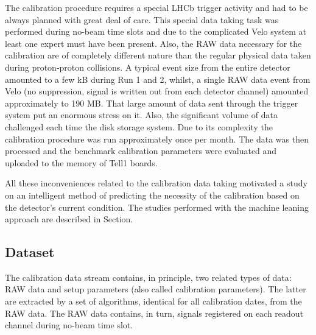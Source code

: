 The calibration procedure requires a special LHCb trigger activity and had to be always planned with great deal of care. This special data taking task was performed during no-beam time slots and due to the complicated Velo system at least one expert must have been present. Also, the RAW data necessary for the calibration are of completely different nature than the regular physical data taken during proton-proton collisions. A typical event size from the entire detector amounted to a few kB during Run 1 and 2, whilst, a single RAW data event from Velo (no suppression, signal is written out from each detector channel) amounted approximately to 190 MB. That large amount of data sent through the trigger system put an enormous stress on it. Also, the significant volume of data challenged each time the disk storage system. Due to its complexity the calibration procedure was run approximately once per month. The data was then processed and the benchmark calibration parameters were evaluated and uploaded to the memory of Tell1 boards. 

All these inconveniences related to the calibration data taking motivated a study on an intelligent method of predicting the necessity of the calibration based on the detector's current condition. The studies performed with the machine leaning approach are described in Section.

\subsection{Dataset}

The calibration data stream contains, in principle, two related types of data: RAW data and setup parameters (also called calibration parameters). The latter are extracted by a set of algorithms, identical for all calibration dates, from the RAW data.
The RAW data contains, in turn, signals registered on each readout channel during no-beam time slot.

  

